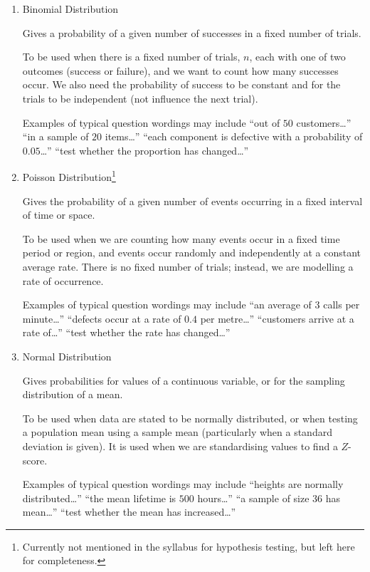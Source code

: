 \begin{enumerate}
    \item Binomial Distribution 
     
    Gives a probability of a given number of successes in a fixed number of trials.
    
    To be used when there is a fixed number of trials, $n$, each with one of two outcomes (success or failure), and we want to count how many successes occur. We also need the probability of success to be constant and for the trials to be independent (not influence the next trial).

    Examples of typical question wordings may include ``out of $50$ customers\ldots'' ``in a sample of $20$ items\ldots'' ``each component is defective with a probability of $0.05$\ldots'' ``test whether the proportion has changed\ldots''

    \item Poisson Distribution\footnote{Currently not mentioned in the syllabus for hypothesis testing, but left here for completeness.}  
    
    Gives the probability of a given number of events occurring in a fixed interval of time or space.

    To be used when we are counting how many events occur in a fixed time period or region, and events occur randomly and independently at a constant average rate. There is no fixed number of trials; instead, we are modelling a rate of occurrence.

    Examples of typical question wordings may include ``an average of $3$ calls per minute\ldots'' ``defects occur at a rate of $0.4$ per metre\ldots'' ``customers arrive at a rate of\ldots'' ``test whether the rate has changed\ldots''

    \item Normal Distribution  
    
    Gives probabilities for values of a continuous variable, or for the sampling distribution of a mean.

    To be used when data are stated to be normally distributed, or when testing a population mean using a sample mean (particularly when a standard deviation is given). It is used when we are standardising values to find a $Z$-score.

    Examples of typical question wordings may include ``heights are normally distributed\ldots'' ``the mean lifetime is $500$ hours\ldots'' ``a sample of size $36$ has mean\ldots'' ``test whether the mean has increased\ldots''


\end{enumerate}
